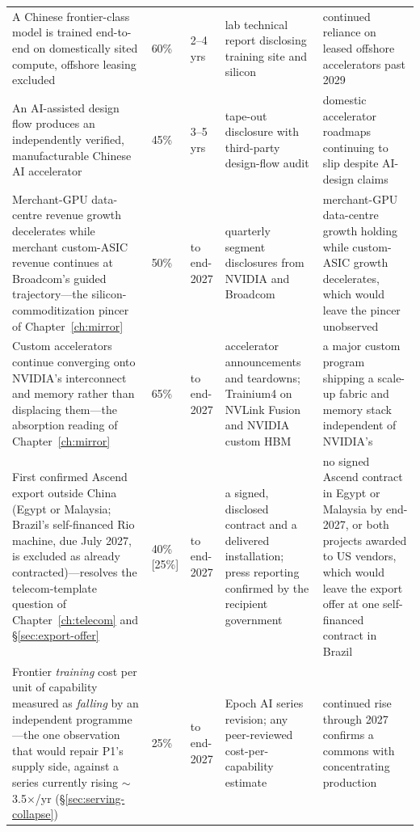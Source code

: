 \begin{small}
\begin{longtable}{p{42mm}p{16mm}p{13mm}p{31mm}p{31mm}}
    \addlinespace
    A Chinese frontier-class model is trained end-to-end on domestically sited compute, offshore leasing excluded & 60\% & 2--4 yrs & lab technical report disclosing training site and silicon & continued reliance on leased offshore accelerators past 2029 \\
    \addlinespace
    An AI-assisted design flow produces an independently verified, manufacturable Chinese AI accelerator & 45\% & 3--5 yrs & tape-out disclosure with third-party design-flow audit & domestic accelerator roadmaps continuing to slip despite AI-design claims \\
    \addlinespace
    Merchant-GPU data-centre revenue growth decelerates while merchant custom-ASIC revenue continues at Broadcom's guided trajectory---the silicon-commoditization pincer of Chapter~\ref{ch:mirror} & 50\% & to end-2027 & quarterly segment disclosures from NVIDIA and Broadcom~\cite{broadcom-q2fy26} & merchant-GPU data-centre growth holding while custom-ASIC growth decelerates, which would leave the pincer unobserved \\
    \addlinespace
    Custom accelerators continue converging onto NVIDIA's interconnect and memory rather than displacing them---the absorption reading of Chapter~\ref{ch:mirror} & 65\% & to end-2027 & accelerator announcements and teardowns; Trainium4 on NVLink Fusion and NVIDIA custom HBM~\cite{aws-nvda} & a major custom program shipping a scale-up fabric and memory stack independent of NVIDIA's \\
    \addlinespace
    First confirmed Ascend export outside China (Egypt or Malaysia; Brazil's self-financed Rio machine, due July 2027, is excluded as already contracted)---resolves the telecom-template question of Chapter~\ref{ch:telecom} and \S\ref{sec:export-offer} & 40\% [25\%] & to end-2027 & a signed, disclosed contract and a delivered installation; press reporting confirmed by the recipient government~\cite{huawei-egypt,huawei-malaysia} & no signed Ascend contract in Egypt or Malaysia by end-2027, or both projects awarded to US vendors, which would leave the export offer at one self-financed contract in Brazil \\
    \addlinespace
    Frontier \emph{training} cost per unit of capability measured as \emph{falling} by an independent programme---the one observation that would repair P1's supply side, against a series currently rising $\sim$3.5$\times$/yr (\S\ref{sec:serving-collapse}) & 25\% & to end-2027 & Epoch AI series revision; any peer-reviewed cost-per-capability estimate & continued rise through 2027 confirms a commons with concentrating production \\

\end{longtable}
\end{small}
